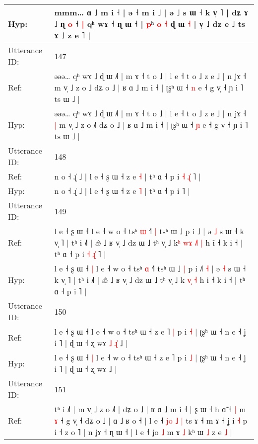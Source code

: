 \documentclass[10pt]{article}
\DeclareRobustCommand{\hl}[1]{{\textcolor{red}{#1}}}
\begin{document}
\begin{longtable}{ll}
 \\
Hyp: & mmm…\hl{}\hl{} ɑ ˩ m i ˧ | ə ˧ m i\hl{}\hl{}\hl{}\hl{}\hl{}\hl{} ˩ | ə ˩ s ɯ ˧ k v̩ ˥ | dʑ ɤ ˩ ɳ \hl{o} ˧\hl{ }\hl{|} qʰ wɤ ˧ ɳ ɯ ˧ | \hl{p}ʰ \hl{}\hl{o} \hl{˧} ɖ ɯ \hl{}\hl{˧} | v̩ ˩ dz e ˩ ts ɤ ˩ z e ˥ |
 \\
\midrule
Utterance ID: & 147 \\
Ref: & əəə… qʰ wɤ ˩ ɖ ɯ ˩˥ | m ɤ ˧ t o ˩ | l e ˧ t o ˩ z e ˩ | n jɤ ˧\hl{}\hl{} m v̩ ˩ z o ˩\hl{} dʑ o ˩ | ʁ ɑ ˩ m i ˧ | ʈʂʰ ɯ ˧ \hl{n} e ˧ g v̩ ˧ ɲ i ˥ ts ɯ ˩ |
 \\
Hyp: & əəə… qʰ wɤ ˩ ɖ ɯ ˩˥ | m ɤ ˧ t o ˩ | l e ˧ t o ˩ z e ˩ | n jɤ ˧\hl{ }\hl{|} m v̩ ˩ z o ˩\hl{˥} dʑ o ˩ | ʁ ɑ ˩ m i ˧ | ʈʂʰ ɯ ˧ \hl{ɲ} e ˧ g v̩ ˧ ɲ i ˥ ts ɯ ˩ |
 \\
\midrule
Utterance ID: & 148 \\
Ref: & n o ˧ ɻ̍ ˩ | l e ˧ ʂ ɯ ˧ z e \hl{˧} | tʰ ɑ ˧ p i\hl{ }\hl{˧}\hl{ }\hl{ɻ}\hl{̍} ˥ |
 \\
Hyp: & n o ˧ ɻ̍ ˩ | l e ˧ ʂ ɯ ˧ z e \hl{˥} | tʰ ɑ ˧ p i\hl{}\hl{}\hl{}\hl{}\hl{} ˥ |
 \\
\midrule
Utterance ID: & 149 \\
Ref: & l e ˧ ʂ ɯ ˧\hl{}\hl{} l e ˧ w o ˧ tsʰ \hl{ɯ} ˧˥\hl{ }\hl{|} tsʰ ɯ ˩\hl{}\hl{} p i ˩\hl{}\hl{}\hl{} | ə \hl{˩} s ɯ ˧ k v̩ ˥ | tʰ i ˩˥ | æ̃ ˩ ʁ v̩ ˩ dz ɯ ˩ tʰ v̩ ˩ k\hl{ʰ}\hl{ }\hl{w}\hl{ɤ} \hl{˩}\hl{˥} \hl{|} h i\hl{̃} ˧ k i ˧ | tʰ ɑ ˧ p i\hl{ }\hl{˧}\hl{ }\hl{ɻ}\hl{̍} ˥ |
 \\
Hyp: & l e ˧ ʂ ɯ ˧\hl{ }\hl{|} l e ˧ w o ˧ tsʰ \hl{ɑ} ˧˥\hl{}\hl{} tsʰ ɯ ˩\hl{ }\hl{|} p i ˩\hl{˥}\hl{ }\hl{˧} | ə \hl{˧} s ɯ ˧ k v̩ ˥ | tʰ i ˩˥ | æ̃ ˩ ʁ v̩ ˩ dz ɯ ˩ tʰ v̩ ˩ k\hl{}\hl{}\hl{}\hl{} \hl{v}\hl{̩} \hl{˧} h i\hl{} ˧ k i ˧ | tʰ ɑ ˧ p i\hl{}\hl{}\hl{}\hl{}\hl{} ˥ |
 \\
\midrule
Utterance ID: & 150 \\
Ref: & l e ˧ ʂ ɯ ˧\hl{}\hl{} l e ˧ w o ˧ tsʰ ɯ ˧ z e ˥\hl{ }\hl{|} p i \hl{˧} | ʈʂʰ ɯ ˧ n e ˧ ʝ i ˥ | ɖ ɯ ˧ ʐ wɤ\hl{ }\hl{˩}\hl{ }\hl{ɻ}\hl{̍} ˩ |
 \\
Hyp: & l e ˧ ʂ ɯ ˧\hl{ }\hl{|} l e ˧ w o ˧ tsʰ ɯ ˧ z e ˥\hl{}\hl{} p i \hl{˩} | ʈʂʰ ɯ ˧ n e ˧ ʝ i ˥ | ɖ ɯ ˧ ʐ wɤ\hl{}\hl{}\hl{}\hl{}\hl{} ˩ |
 \\
\midrule
Utterance ID: & 151 \\
Ref: & tʰ i ˩˥ | m v̩ ˩ z o ˩˥ | dʑ o ˩ | ʁ ɑ ˩ m i ˧ | ʂ ɯ ˧ h ɑ̃ ˧\hl{ }\hl{|} m \hl{ɤ} ˧ g v̩ ˧ dʑ o ˩ | ɑ ˩ ʁ o ˧ | l e ˧ \hl{j}\hl{o} \hl{˩} \hl{|} ts ɤ ˧\hl{}\hl{}\hl{} m ɤ ˧ ʝ i\hl{}\hl{} \hl{˧} p i ˧ z o ˥ | n jɤ ˧ ɳ ɯ ˧ | l e ˧ jo \hl{˩} m ɤ \hl{˩} kʰ ɯ \hl{˩} z e \hl{˩} |

\end{longtable}
\end{document}
